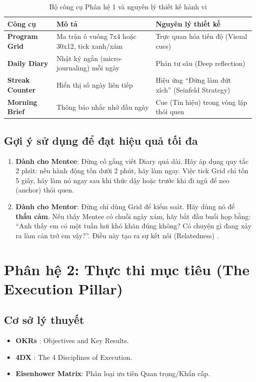 \begin{table}[H]
  \centering
  \begin{tabularx}{\textwidth}{|L|L|L|}
    \hline
     \textbf{\color{white} Công cụ} & \textbf{\color{white} Mô tả} & \textbf{\color{white} Nguyên lý thiết kế} \\ \hline
    \textbf{Program Grid} & Ma trận ô vuông 7x4 hoặc 30x12, tick xanh/xám & Trực quan hóa tiến độ (Visual cues) \\ \hline
    \textbf{Daily Diary} & Nhật ký ngắn (micro-journaling) mỗi ngày & Phản tư sâu (Deep reflection) \\ \hline
    \textbf{Streak Counter} & Hiển thị số ngày liên tiếp & Hiệu ứng ``Đừng làm đứt xích'' (Seinfeld Strategy) \\ \hline
    \textbf{Morning Brief} & Thông báo nhắc nhở đầu ngày & Cue (Tín hiệu) trong vòng lặp thói quen \\ \hline
  \end{tabularx}
  \caption{Bộ công cụ Phân hệ 1 và nguyên lý thiết kế hành vi}
\end{table}

\subsection{Gợi ý sử dụng để đạt hiệu quả tối đa}
\begin{enumerate}
    \item \textbf{Dành cho Mentee}: Đừng cố gắng viết Diary quá dài. Hãy áp dụng quy tắc 2 phút: nếu hành động tốn dưới 2 phút, hãy làm ngay. Việc tick Grid chỉ tốn 5 giây, hãy làm nó ngay sau khi thức dậy hoặc trước khi đi ngủ để neo (anchor) thói quen.
    \item \textbf{Dành cho Mentor}: Đừng chỉ dùng Grid để kiểm soát. Hãy dùng nó để \textbf{thấu cảm}. Nếu thấy Mentee có chuỗi ngày xám, hãy bắt đầu buổi họp bằng: ``Anh thấy em có một tuần hơi khó khăn đúng không? Có chuyện gì đang xảy ra làm cản trở em vậy?''. Điều này tạo ra sự kết nối (Relatedness) \citep{ryan2000}.
\end{enumerate}

\section{Phân hệ 2: Thực thi mục tiêu (The Execution Pillar)}

\subsection{Cơ sở lý thuyết}
\begin{itemize}
  \item \textbf{OKRs} \citep{okrs2018}: Objectives and Key Results.
  \item \textbf{4DX} \citep{4dx2012}: The 4 Disciplines of Execution.
  \item \textbf{Eisenhower Matrix}: Phân loại ưu tiên Quan trọng/Khẩn cấp.
\end{itemize}

